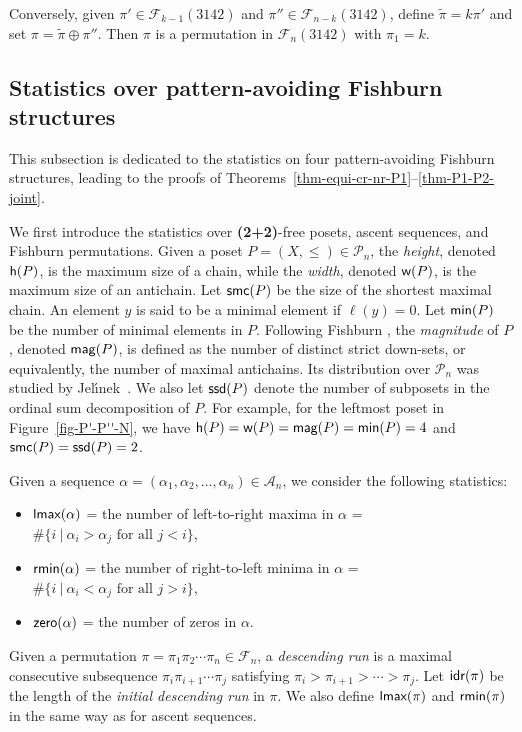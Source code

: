 \documentclass[11pt]{article}
\DeclareMathOperator{\h}{\mbox{\sf{h}}}
\DeclareMathOperator{\smc}{\mbox{\sf{smc}}}
\DeclareMathOperator{\magg}{\mbox{\sf{mag}}}
\DeclareMathOperator{\wid}{\mbox{\sf{w}}}
\DeclareMathOperator{\minn}{\mbox{\sf{min}}}
\DeclareMathOperator{\ssd}{\mbox{\sf{ssd}}}
\DeclareMathOperator{\idr}{\mbox{\sf{idr}}}
\DeclareMathOperator{\lmax}{\mbox{\sf{lmax}}}
\DeclareMathOperator{\rmin}{\mbox{\sf{rmin}}}
\DeclareMathOperator{\zero}{\mbox{\sf{zero}}}
\newcommand{\A}{\mathcal{A}}
\newcommand{\F}{\mathcal{F}}
\begin{document}
	Conversely, given $\pi' \in \F_{k-1}(3142)$ and $\pi'' \in \F_{n-k}(3142)$, define $\widetilde{\pi} = k\pi'$ and set $\pi = \widetilde{\pi} \oplus \pi''$. Then $\pi$ is a permutation in $\F_n(3142)$ with $\pi_1 = k$.
	
	\subsection{Statistics over pattern-avoiding Fishburn structures}\label{stats-St-matchings-subsec}
	This subsection is dedicated to the statistics on four pattern-avoiding Fishburn structures, leading to the proofs of Theorems~\ref{thm-equi-cr-nr-P1}--\ref{thm-P1-P2-joint}.
	
	We first introduce the statistics over \textbf{(2+2)}-free posets, ascent sequences, and Fishburn permutations.
	Given a poset \( P = (X, \le ) \in \mathcal{P}_n\), 
	the {\it height}, denoted $\h(P)$, is the maximum size
	of a chain, while the {\it width}, denoted $\wid(P)$, is the maximum size
	of an antichain. Let $\smc(P)$ be the  size of the shortest maximal chain.
	An element $y$ is said to be a minimal element if $\ell(y)=0$.
	Let $\minn(P)$ be the number of minimal elements in $P$. 
	Following Fishburn \cite{Fishburn-1983,Fishburn-1985}, the \emph{magnitude} of $P$, denoted $\magg(P)$, is defined as the number of distinct strict down-sets, or equivalently, the number of maximal antichains. Its distribution over $\mathcal{P}_n$ was studied by Jel\'{\i}nek~\cite{Jelinek}. 
	We also let $\ssd(P)$ denote the number of subposets in the ordinal sum decomposition of $P$.
	For example, for the leftmost poset in Figure~\ref{fig-P'-P''-N}, we have $\h(P) = \wid(P)=\magg(P)=\minn(P) = 4$ and $\smc(P)=\ssd(P) = 2$.
	
	Given a sequence $\alpha = (\alpha_1, \alpha_2, \ldots, \alpha_n) \in \A_n$, we consider the following statistics:
	\begin{itemize}
		\item $\lmax(\alpha)$ = the number of left-to-right maxima  in $\alpha$ = $\#\{i\ |\ \alpha_i> \alpha_j \text{ for all } j<i\}$, 
		\item $\rmin(\alpha)$ = the number of right-to-left minima  in $\alpha$ = $\#\{i\ |\ \alpha_i< \alpha_j \text{ for all } j>i\}$,
		\item $\zero(\alpha)$ = the number of zeros in $\alpha$.
	\end{itemize}
	
	Given a permutation $\pi=\pi_1\pi_2\cdots\pi_n \in \mathcal{F}_n$, a \emph{descending run} is a maximal consecutive subsequence $\pi_i\pi_{i+1}\cdots\pi_j$ satisfying $\pi_i>\pi_{i+1}>\cdots>\pi_j$. Let $\idr(\pi)$ be the length of the {\it initial descending run} in $\pi$. We also define $\lmax(\pi)$ and $\rmin(\pi)$ in the same way as for ascent sequences.
	
\end{document}
